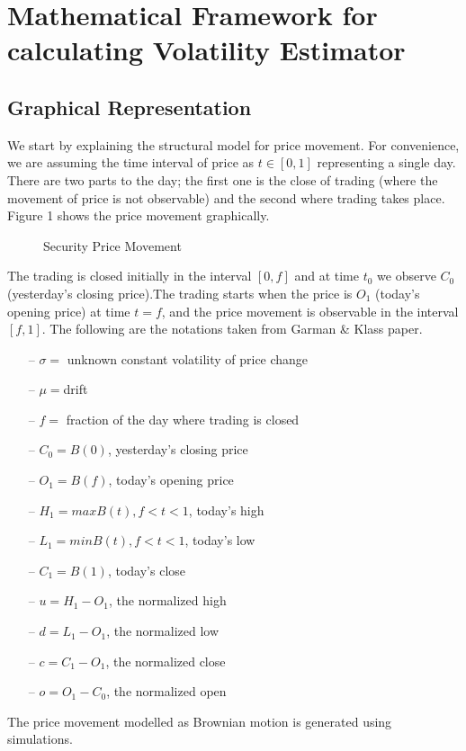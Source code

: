 \documentclass[12pt]{article}   	%
\begin{document}
\section{Mathematical Framework for calculating Volatility Estimator}
\subsection{Graphical Representation}
We start by explaining the structural model for price movement. For convenience, we are assuming the time interval of price as $t \in [0,1]$ representing a single day. There are two parts to the day; the first one is the close of trading (where the movement of price is not observable) and the second where trading takes place. Figure 1 shows the price movement graphically.
 
\begin{figure}
	\centering
	\caption{Security Price Movement}
	\label{fig:SPM}
\end{figure}

\par The trading is closed initially in the interval $[0,f]$ and at time $t_0$ we observe $C_0$ (yesterday's closing price).The trading starts when the price is $O_1$ (today's opening price) at time $t=f$, and the price movement is observable in the interval $[f,1]$. The following are the notations taken from Garman \& Klass paper.


\begin{itemize}
	\item[--] $\sigma =$ unknown constant volatility of price change
\item[--]$\mu= $drift
\item[--] $f =$ fraction of the day where trading is closed
\item[--] $C_0 = B(0)$, yesterday's closing price
\item[--] $O_1 = B(f)$, today's opening price
\item[--] $H_1 = max B(t), f < t < 1$, today's high
\item[--] $L_1 = min B(t), f < t < 1$, today's low
\item[--] $C_1 = B(1)$, today's close
\item[--] $u = H_1 - O_1$, the normalized high
\item[--] $d = L_1 - O_1$, the normalized low
\item[--] $c = C_1 - O_1$, the normalized close
\item[--] $o = O_1 - C_0$, the normalized open

\end{itemize}
The price movement modelled as Brownian motion is generated using simulations. 
\end{document}
